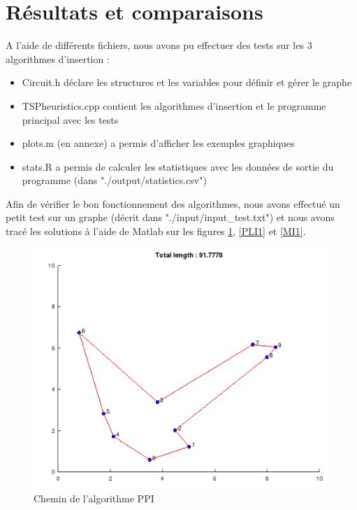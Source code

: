 \documentclass[10pt,a4paper]{article}
\begin{document}
\section{Résultats et comparaisons}

A l'aide de différents fichiers, nous avons pu effectuer des tests sur 
les 3 algorithmes d'insertion :
\begin{itemize}
\item Circuit.h déclare les structures et les variables
pour définir et gérer le graphe
\item TSPheuristics.cpp contient les algorithmes d'insertion
et le programme principal avec les tests
\item plots.m (en annexe) a permis d'afficher les exemples graphiques
\item stats.R a permis de calculer les statistiques avec les données de sortie du programme (dans "./output/statistics.csv")
\end{itemize}

Afin de vérifier le bon fonctionnement des algorithmes, nous avons effectué un petit test sur un graphe
(décrit dans "./input/input\_{}test.txt") et nous avons tracé les solutions à l'aide de Matlab
sur les figures \ref{PPI1}, \ref{PLI1} et \ref{MI1}.

\begin{figure}[!ht]
    \centering
    \includegraphics[width=0.8\linewidth]{img/PPI1.png}
    \caption{Chemin de l'algorithme PPI}
    \label{PPI1}
\end{figure}
\end{document}
